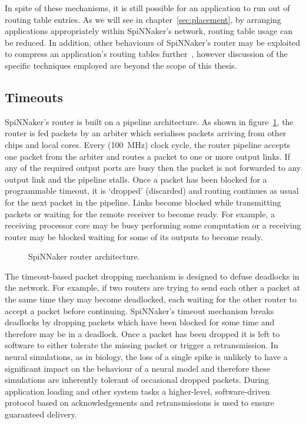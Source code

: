 			In spite of these mechanisms, it is still possible for an application to
			run out of routing table entries. As we will see in
			chapter~\ref{sec:placement}, by arranging applications appropriately
			within SpiNNaker's network, routing table usage can be reduced. In
			addition, other behaviours of SpiNNaker's router may be exploited to
			compress an application's routing tables further~\cite{mundy16}, however
			discussion of the specific techniques employed are beyond the scope of
			this thesis.
		
		\subsection{Timeouts}
			
			SpiNNaker's router is built on a pipeline architecture. As shown in
			figure~\ref{fig:router-architecture}, the router is fed packets by an
			arbiter which serialises packets arriving from other chips and local
			cores. Every (\SI{100}{\mega\hertz}) clock cycle, the router pipeline
			accepts one packet from the arbiter and routes a packet to one or more
			output links. If any of the required output ports are busy then the
			packet is not forwarded to any output link and the pipeline stalls. Once
			a packet has been blocked for a programmable timeout, it is `dropped'
			(discarded) and routing continues as usual for the next packet in the
			pipeline. Links become blocked while transmitting packets or waiting for
			the remote receiver to become ready. For example, a receiving processor
			core may be busy performing some computation or a receiving router may be
			blocked waiting for some of its outputs to become ready.
			
			\begin{figure}
				\center
				
				\caption{SpiNNaker router architecture.}
				\label{fig:router-architecture}
			\end{figure}
			
			The timeout-based packet dropping mechanism is designed to defuse
			deadlocks in the network. For example, if two routers are trying to send
			each other a packet at the same time they may become deadlocked, each
			waiting for the other router to accept a packet before continuing.
			SpiNNaker's timeout mechanism breaks deadlocks by dropping packets which
			have been blocked for some time and therefore may be in a deadlock.  Once
			a packet has been dropped it is left to software to either tolerate the
			missing packet or trigger a retransmission. In neural simulations, as in
			biology, the loss of a single spike is unlikely to have a significant
			impact on the behaviour of a neural model and therefore these simulations
			are inherently tolerant of occasional dropped packets. During application
			loading and other system tasks a higher-level, software-driven protocol
			based on acknowledgements and retransmissions is used to ensure
			guaranteed delivery.
			
